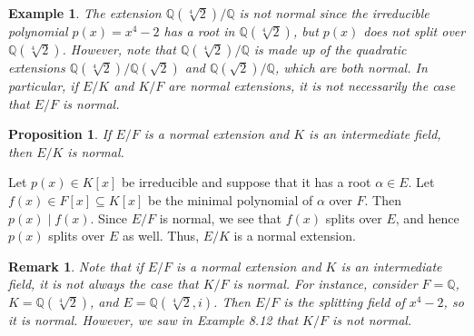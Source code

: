 \documentclass[10pt]{article}
\makeatletter
\newcommand{\Q}{\mathbb{Q}}
\theoremstyle{newstyle}
\newtheorem{remark}[thm]{Remark}
\newtheorem{prop}[thm]{Proposition}
\newtheorem{exmp}[thm]{Example}
\newenvironment{pf}[1][\proofname]{\par
  \pushQED{\qed}%
  \normalfont \topsep0\p@\relax
  \trivlist
  \item[\hskip\labelsep\scshape
  #1\@addpunct{.}]\ignorespaces
}{%
  \popQED\endtrivlist\@endpefalse
}
\makeatother
\begin{document}
\begin{exmp}
The extension $\Q(\sqrt[4]{2})/\Q$ is not normal since the irreducible polynomial 
$p(x) = x^4 - 2$ has a root in $\Q(\sqrt[4]{2})$, but $p(x)$ does not split over 
$\Q(\sqrt[4]{2})$. However, note that $\Q(\sqrt[4]{2})/\Q$ is made up of the quadratic 
extensions $\Q(\sqrt[4]{2})/\Q(\sqrt2)$ and $\Q(\sqrt2)/\Q$, which are both normal. 
In particular, if $E/K$ and $K/F$ are normal extensions, it is not necessarily the case that 
$E/F$ is normal. 
\end{exmp}

\begin{prop}
If $E/F$ is a normal extension and $K$ is an intermediate field, then $E/K$ is normal. 
\end{prop}
\begin{pf}
Let $p(x) \in K[x]$ be irreducible and suppose that it has a root $\alpha \in E$. 
Let $f(x) \in F[x] \subseteq K[x]$ be the minimal polynomial of $\alpha$ over $F$. 
Then $p(x) \mid f(x)$. Since $E/F$ is normal, we see that $f(x)$ splits over $E$, 
and hence $p(x)$ splits over $E$ as well. Thus, $E/K$ is a normal extension.
\end{pf}

\begin{remark}
Note that if $E/F$ is a normal extension and $K$ is an intermediate field, 
it is not always the case that $K/F$ is normal. For instance, consider 
$F = \Q$, $K = \Q(\sqrt[4]{2})$, and $E = \Q(\sqrt[4]{2}, i)$. Then $E/F$ is the 
splitting field of $x^4 - 2$, so it is normal. However, we saw in Example 8.12 that 
$K/F$ is not normal. 
\end{remark}
\end{document}
